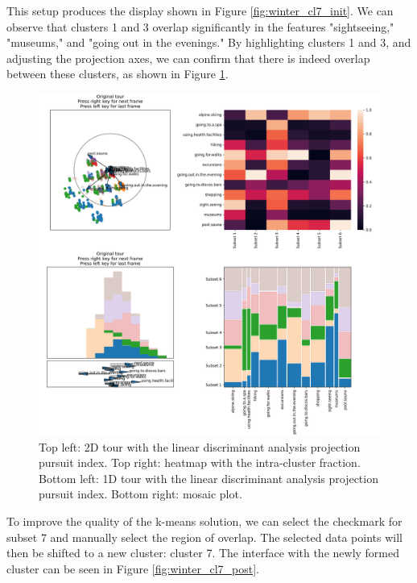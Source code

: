 \documentclass[article]{ajs}
\begin{document}
This setup produces the display shown in Figure \ref{fig:winter_cl7_init}. We can observe that clusters 1 and 3 overlap significantly in the features "sightseeing," "museums," and "going out in the evenings." By highlighting clusters 1 and 3, and adjusting the projection axes, we can confirm that there is indeed overlap between these clusters, as shown in Figure \ref{fig:winter_cl7_pre}.

\begin{figure}[h!]
    \centering
    \includegraphics[width=1\textwidth]{winter_cl7_pre.png}
    \caption{Top left: 2D tour with the linear discriminant analysis projection pursuit index. Top right: heatmap with the intra-cluster fraction. Bottom left: 1D tour with the linear discriminant analysis projection pursuit index. Bottom right: mosaic plot.}
    \label{fig:winter_cl7_pre}
\end{figure}

To improve the quality of the k-means solution, we can select the checkmark for subset 7 and manually select the region of overlap. The selected data points will then be shifted to a new cluster: cluster 7. The interface with the newly formed cluster can be seen in Figure \ref{fig:winter_cl7_post}.
\end{document}
